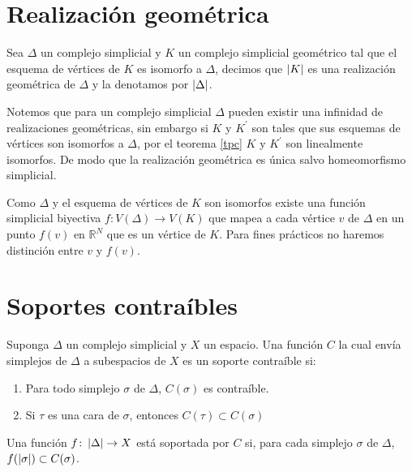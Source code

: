 \section{Realización geométrica}
\begin{Defi}
Sea $\Delta$ un complejo simplicial y $K$ un complejo simplicial geométrico tal que el esquema de vértices de $K$ es isomorfo a $\Delta$, decimos que $\left| K \right|$ es una realización geométrica de $\Delta$ y la denotamos por $\left| \Delta \right|$.
\end{Defi}
Notemos que para un complejo simplicial $\Delta$ pueden existir una infinidad de realizaciones geométricas, sin embargo si $K$ y $K^{'}$ son tales que sus esquemas de vértices son isomorfos a $\Delta$, por el teorema \ref{tpc} $K$ y $K^{'}$ son linealmente isomorfos. De modo que la realización geométrica es única salvo homeomorfismo simplicial.

Como $\Delta$ y el esquema de vértices de $K$ son isomorfos existe una función simplicial biyectiva $f\colon V(\Delta)\rightarrow V(K)$ que mapea a cada vértice $v$ de $\Delta$ en un punto $f(v)$ en $\mathbb{R}^N$ que es un vértice de $K$. Para fines prácticos no haremos distinción entre $v$ y $f(v)$.

\section{Soportes contraíbles}
\begin{Defi}
Suponga $\Delta$ un complejo simplicial y $X$ un espacio. Una función $C$ la cual envía simplejos de $\Delta$ a subespacios de $X$ es un soporte contraíble si:
\begin{enumerate}
\item Para todo simplejo $\sigma$ de $\Delta$, $C(\sigma)$ es contraíble.
\item Si $\tau$ es una cara de $\sigma$, entonces $C(\tau)\subset C(\sigma)$
\end{enumerate}
\end{Defi}
\begin{Defi}
Una función $f\colon \left| \Delta \right| \rightarrow X$ está soportada por $C$ si, para cada simplejo $\sigma$ de $\Delta$, $f(\left| \sigma \right|)\subset C(\sigma)$.
\end{Defi}

